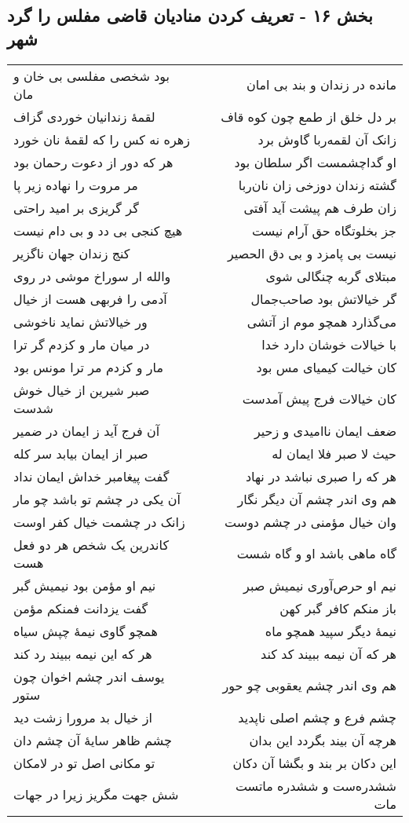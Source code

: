 \begin{center}
\section*{بخش ۱۶ - تعریف کردن منادیان قاضی مفلس را گرد شهر}
\label{sec:sh016}
\begin{longtable}{l p{0.5cm} r}
بود شخصی مفلسی بی خان و مان
&&
مانده در زندان و بند بی امان
\\
لقمهٔ زندانیان خوردی گزاف
&&
بر دل خلق از طمع چون کوه قاف
\\
زهره نه کس را که لقمهٔ نان خورد
&&
زانک آن لقمه‌ربا گاوش برد
\\
هر که دور از دعوت رحمان بود
&&
او گداچشمست اگر سلطان بود
\\
مر مروت را نهاده زیر پا
&&
گشته زندان دوزخی زان نان‌ربا
\\
گر گریزی بر امید راحتی
&&
زان طرف هم پیشت آید آفتی
\\
هیچ کنجی بی دد و بی دام نیست
&&
جز بخلوتگاه حق آرام نیست
\\
کنج زندان جهان ناگزیر
&&
نیست بی پامزد و بی دق الحصیر
\\
والله ار سوراخ موشی در روی
&&
مبتلای گربه چنگالی شوی
\\
آدمی را فربهی هست از خیال
&&
گر خیالاتش بود صاحب‌جمال
\\
ور خیالاتش نماید ناخوشی
&&
می‌گذارد همچو موم از آتشی
\\
در میان مار و کزدم گر ترا
&&
با خیالات خوشان دارد خدا
\\
مار و کزدم مر ترا مونس بود
&&
کان خیالت کیمیای مس بود
\\
صبر شیرین از خیال خوش شدست
&&
کان خیالات فرج پیش آمدست
\\
آن فرج آید ز ایمان در ضمیر
&&
ضعف ایمان ناامیدی و زحیر
\\
صبر از ایمان بیابد سر کله
&&
حیث لا صبر فلا ایمان له
\\
گفت پیغامبر خداش ایمان نداد
&&
هر که را صبری نباشد در نهاد
\\
آن یکی در چشم تو باشد چو مار
&&
هم وی اندر چشم آن دیگر نگار
\\
زانک در چشمت خیال کفر اوست
&&
وان خیال مؤمنی در چشم دوست
\\
کاندرین یک شخص هر دو فعل هست
&&
گاه ماهی باشد او و گاه شست
\\
نیم او مؤمن بود نیمیش گبر
&&
نیم او حرص‌آوری نیمیش صبر
\\
گفت یزدانت فمنکم مؤمن
&&
باز منکم کافر گبر کهن
\\
همچو گاوی نیمهٔ چپش سیاه
&&
نیمهٔ دیگر سپید همچو ماه
\\
هر که این نیمه ببیند رد کند
&&
هر که آن نیمه ببیند کد کند
\\
یوسف اندر چشم اخوان چون ستور
&&
هم وی اندر چشم یعقوبی چو حور
\\
از خیال بد مرورا زشت دید
&&
چشم فرع و چشم اصلی ناپدید
\\
چشم ظاهر سایهٔ آن چشم دان
&&
هرچه آن بیند بگردد این بدان
\\
تو مکانی اصل تو در لامکان
&&
این دکان بر بند و بگشا آن دکان
\\
شش جهت مگریز زیرا در جهات
&&
ششدره‌ست و ششدره ماتست مات
\\
\end{longtable}
\end{center}

